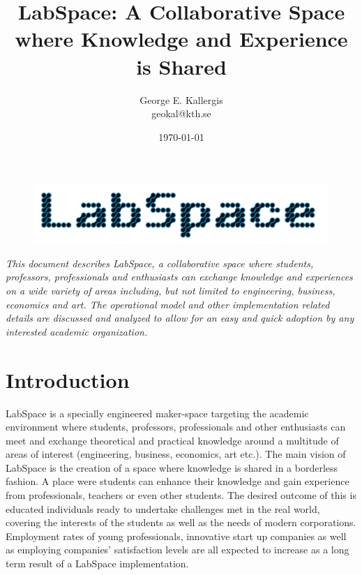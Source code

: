 \documentclass[a4paper, 11pt]{article}
\title{LabSpace: A Collaborative Space where Knowledge and Experience is Shared}
\author{George E. Kallergis\\geokal@kth.se}
\date{\today{}}
\begin{document}
\maketitle

\begin{figure}[h!]
  \begin{center}
    \includegraphics[width=\textwidth,height=\textheight,keepaspectratio]{imagery/logo.png}
    \label{fig:dneaf}
  \end{center}
\end{figure}

\textit{This document describes LabSpace, a collaborative space where students, professors, professionals and enthusiasts can exchange knowledge and experiences on a wide variety of areas including, but not limited to engineering, business, economics and art. The operational model and other implementation related details are discussed and analyzed to allow for an easy and quick adoption by any interested academic organization.}

\newpage

\section*{Introduction}
LabSpace is a specially engineered maker-space \cite{whatsamakerspace} targeting the academic environment where students, professors, professionals and other enthusiasts can meet and exchange theoretical and practical knowledge around a multitude of areas of interest (engineering, business, economics, art etc.). The main vision of LabSpace is the creation of a space where knowledge is shared in a borderless fashion. A place were students can enhance their knowledge and gain experience from  professionals, teachers or even other students. The desired outcome of this is educated individuals ready to undertake challenges met in the real world, covering  the interests of the students as well as the needs of modern corporations. Employment rates of young professionals, innovative start up companies as well as employing companies' satisfaction levels are all expected to increase as a long term result of a LabSpace implementation.
\end{document}
